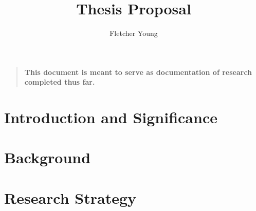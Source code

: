 \documentclass[runningheads,a4paper]{llncs}
\newenvironment{sciabstract}{%
\begin{quote} \bf}
{\end{quote}}
\begin{document}
	\mainmatter  %
	\title{Thesis Proposal}
	\author{Fletcher Young}%
	
	\maketitle
	\begin{sciabstract}
		This document is meant to serve as documentation of research completed thus far.
	\end{sciabstract}

\section{Introduction and Significance}
\section{Background}
\section{Research Strategy}
\end{document}
